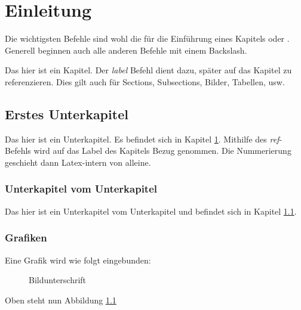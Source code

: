 \chapter{Einleitung}\label{ch_ersteskapitel}
Die wichtigsten Befehle sind wohl die für die Einführung eines Kapitels  oder . Generell beginnen auch alle anderen Befehle mit einem Backslash.

Das hier ist ein Kapitel. Der \textit{label} Befehl dient dazu, später auf das Kapitel zu referenzieren. Dies gilt auch für Sections, Subsections, Bilder, Tabellen, usw.\\

\section{Erstes Unterkapitel}
\label{sec_erstesunterkapitel}
Das hier ist ein Unterkapitel. Es befindet sich in Kapitel \ref{ch_ersteskapitel}. Mithilfe des \textit{ref}-Befehls wird auf das Label des Kapitels Bezug genommen.
Die Nummerierung geschieht dann Latex-intern von alleine.


\subsection{Unterkapitel vom Unterkapitel}
\label{subsec_unterkapitelvomunterkapitel}
Das hier ist ein Unterkapitel vom Unterkapitel und befindet sich in Kapitel \ref{sec_erstesunterkapitel}.

\subsection{Grafiken}
\label{Grafiken}
Eine Grafik wird wie folgt eingebunden:\\
\begin{figure}[h!]
    \centering
    \setlength{\fboxsep}{1pt}
    \setlength{\fboxrule}{1pt}
    \caption[EintragAbbildungsverzeichnis]{Bildunterschrift}
    \label{Label}
\end{figure}

Oben steht nun Abbildung \ref{Label}

